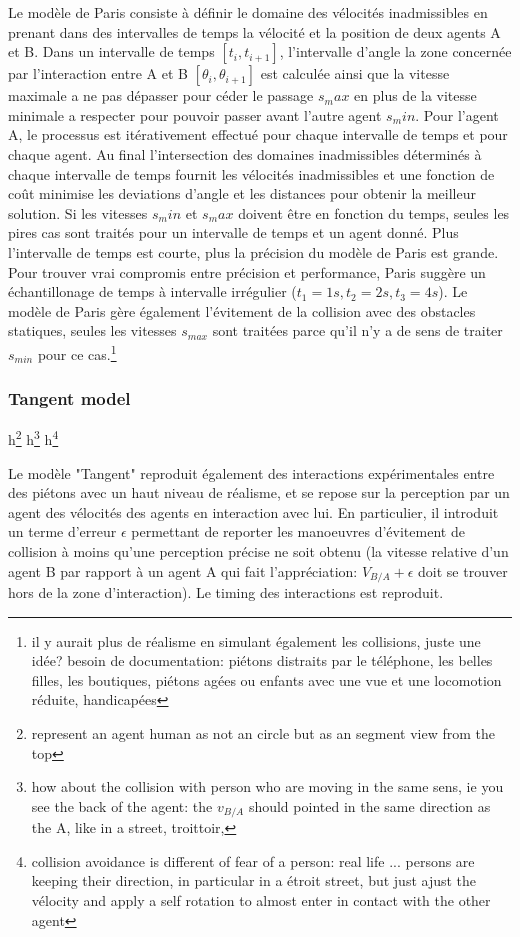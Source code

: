\documentclass[11pt]{report}
\begin{document}
Le modèle de Paris consiste à définir le domaine des vélocités inadmissibles en prenant dans des intervalles de temps la vélocité et la position de deux agents A et B. Dans un intervalle de temps $[t_i, t_{i+1}]$, l'intervalle d'angle la zone concernée par l'interaction entre A et B $[\theta_i, \theta_{i+1}]$ est calculée ainsi que la vitesse maximale a ne pas dépasser pour céder le passage $s_max$ en plus de la vitesse minimale a respecter pour pouvoir passer avant l'autre agent $s_min$. Pour l'agent A, le processus est itérativement effectué pour chaque intervalle de temps et pour chaque agent. Au final l'intersection des domaines inadmissibles déterminés à chaque intervalle de temps fournit les vélocités inadmissibles et une fonction de coût minimise les deviations d'angle et les distances pour obtenir la meilleur solution.
Si les vitesses $s_min$ et $s_max$ doivent être en fonction du temps, seules les pires cas sont traités pour un intervalle de temps et un agent donné. Plus l'intervalle de temps est courte, plus la précision du modèle de Paris est grande. Pour trouver vrai compromis entre précision et performance, Paris suggère un échantillonage de temps à intervalle irrégulier ($t_1 = 1s, t_2 = 2s, t_3 = 4s$).
Le modèle de Paris gère également l'évitement de la collision avec des obstacles statiques, seules les vitesses $s_{max}$ sont traitées parce qu'il n'y a de sens de traiter $s_{min}$ pour ce cas.\footnote{il y aurait plus de réalisme en simulant également les collisions, juste une idée? besoin de documentation: piétons distraits par le téléphone, les belles filles, les boutiques, piétons agées ou enfants avec une vue et une locomotion réduite, handicapées}

\subsubsection{Tangent model}

h\footnote{represent an agent human as not an circle but as an segment view from the top}
h\footnote{how about the collision with person who are moving in the same sens, ie you see the back of the agent: the $v_{B/A}$ should pointed in the same direction as the A, like in a street, troittoir,}
h\footnote{collision avoidance is different of fear of a person: real life ... persons are keeping their direction, in particular in a étroit street, but just ajust the vélocity and apply a self rotation to almost enter in contact with the other agent}

Le modèle "Tangent" reproduit également des interactions expérimentales entre des piétons avec un haut niveau de réalisme, et se repose sur la perception par un agent des vélocités des agents en interaction avec lui. En particulier, il introduit un terme d'erreur $\epsilon$ permettant de reporter les manoeuvres d'évitement de collision à moins qu'une perception précise ne soit obtenu (la vitesse relative d'un agent B par rapport à un agent A qui fait l'appréciation: $V_{B/A} + \epsilon$ doit se trouver hors de la zone d'interaction). Le timing des interactions est reproduit. 
\end{document}
